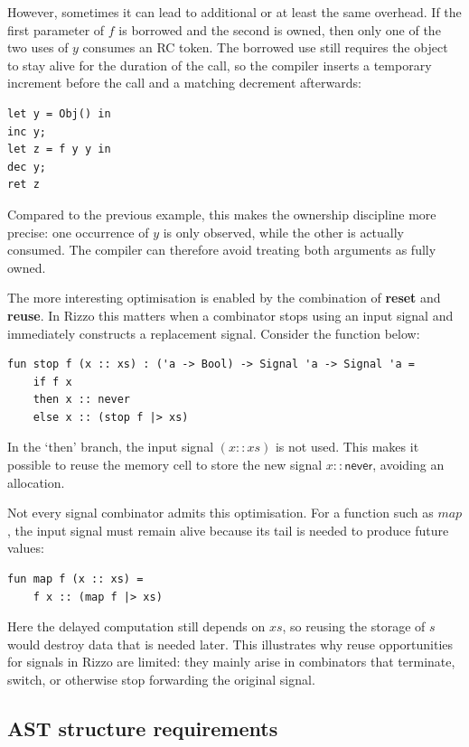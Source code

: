However, sometimes it can lead to additional or at least the same overhead. 
If the first parameter of $f$ is borrowed and the second is owned, then only one of the two uses of $y$ consumes an RC token. The borrowed use still requires the object to stay alive for the duration of the call, so the compiler inserts a temporary increment before the call and a matching decrement afterwards:

\begin{verbatim}
let y = Obj() in
inc y;
let z = f y y in
dec y;
ret z
\end{verbatim}

Compared to the previous example, this makes the ownership discipline more precise: one occurrence of $y$ is only observed, while the other is actually consumed. The compiler can therefore avoid treating both arguments as fully owned.

The more interesting optimisation is enabled by the combination of \textbf{reset} and \textbf{reuse}. In Rizzo this matters when a combinator stops using an input signal and immediately constructs a replacement signal. Consider the function below:

\begin{lstlisting}
fun stop f (x :: xs) : ('a -> Bool) -> Signal 'a -> Signal 'a =
    if f x 
    then x :: never
    else x :: (stop f |> xs)
\end{lstlisting}

In the `then' branch, the input signal $(x :: xs)$ is not used. This makes it possible to reuse the memory cell to store the new signal $x :: \mathsf{never}$, avoiding an allocation. 

Not every signal combinator admits this optimisation. For a function such as $map$, the input signal must remain alive because its tail is needed to produce future values:

\begin{lstlisting}
fun map f (x :: xs) = 
    f x :: (map f |> xs)
\end{lstlisting}

Here the delayed computation still depends on $xs$, so reusing the storage of $s$ would destroy data that is needed later. This illustrates why reuse opportunities for signals in Rizzo are limited: they mainly arise in combinators that terminate, switch, or otherwise stop forwarding the original signal.



\subsection{AST structure requirements}\label{sec:background:beans:assumptions}


